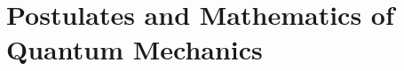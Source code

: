 \chapter{Postulates and Mathematics of Quantum Mechanics}
\label{chap:background+linear algebra}






